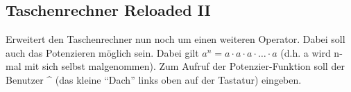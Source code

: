 \subsection{Taschenrechner Reloaded II }
Erweitert den Taschenrechner nun noch um einen weiteren Operator. Dabei soll auch das Potenzieren möglich sein. Dabei gilt $a^n=a\cdot a\cdot a \cdot\ldots\cdot a$ (d.h. a wird n-mal mit sich selbst malgenommen). Zum Aufruf der Potenzier-Funktion soll der Benutzer \^{} (das kleine "`Dach"' links oben auf der Tastatur) eingeben.
